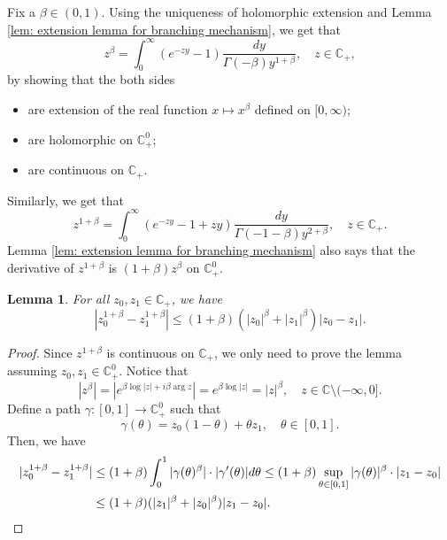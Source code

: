 \documentclass[UTF8]{pkuthss}
\theoremstyle{plain}
\newtheorem{lem}[thm]{Lemma}
\theoremstyle{definition}
\numberwithin{equation}{section}
\begin{document}
    Fix a $\beta \in (0,1)$.
    Using the uniqueness of holomorphic extension and Lemma \ref{lem: extension lemma for branching mechanism}, we get that
\begin{equation}
    z^{\beta}
    = \int_0^\infty (e^{-zy}-1) \frac{dy}{\Gamma(-\beta)y^{1+\beta}},
    \quad z\in \mathbb C_+,
\end{equation}
    by showing that the both sides
\begin{itemize}
\item
    are extension of the real function $x\mapsto x^{\beta}$ defined on $[0,\infty)$;
\item
    are holomorphic on $\mathbb C_+^0$;
\item
    are continuous on $\mathbb C_+$.
\end{itemize}
    Similarly, we get that
\begin{equation}
\label{eq: stable branching on C+}
    z^{1+\beta}
    = \int_0^\infty (e^{-zy}-1+zy)\frac{dy}{\Gamma(-1-\beta)y^{2+\beta}},
    \quad z\in \mathbb C_+.
\end{equation}
    Lemma \ref{lem: extension lemma for branching mechanism} also says that the derivative of $z^{1+\beta}$ is $(1+\beta)z^{\beta}$ on $\mathbb C^0_+$.
\begin{lem}
\label{lem: Lip of power function}
    For all $z_0,z_1 \in \mathbb C_+$, we have
\begin{equation}
\label{eq: Lip of power function}
    |z_0^{1+\beta} - z_1^{1+\beta}|
    \leq (1+\beta)(|z_0|^{\beta}+|z_1|^{\beta})|z_0 - z_1|.
\end{equation}

\end{lem}
\begin{proof}
    Since $z^{1+\beta}$ is continuous on $\mathbb C_+$, we only need to prove the lemma assuming $z_0,z_1 \in \mathbb C^0_+$.
    Notice that
\begin{equation}
\label{eq: upper bound for beta power of z}
    |z^\beta|
    = |e^{\beta \log |z| +i\beta \operatorname {arg}z}| = e^{\beta \log |z|} = |z|^\beta,
    \quad z \in \mathbb C\setminus (-\infty, 0].
\end{equation}
    Define a path $\gamma: [0,1] \to \mathbb C^0_+$ such that
\[
    \gamma(\theta)
    = z_0 (1-\theta) + \theta z_1,
    \quad \theta \in [0,1].
\]
    Then, we have
\begin{align}
    |z_0^{1+\beta} - z_1^{1+\beta}|
    &\leq (1+\beta) \int_0^1 |\gamma(\theta)^{\beta}|\cdot |\gamma'(\theta)|d\theta
    \leq (1+\beta)  \sup_{\theta \in [0,1]} |\gamma(\theta)|^{\beta} \cdot |z_1-z_0|
    \\&\leq (1+\beta)  ( |z_1|^{\beta}+|z_0|^{\beta} ) |z_1-z_0|.
    \qedhere
\end{align}
\end{proof}
\end{document}
